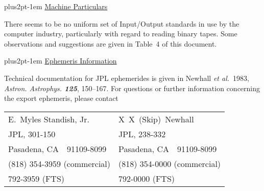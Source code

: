 \documentclass[twoside,11pt,nolof]{starlink}
\providecommand{\hdg}[1]{\vskip4pt plus2pt\leavevmode\kern-1em \underline{\large{#1}}\par}
\begin{document}
\hdg{Machine Particulars}

There seems to be no uniform set of Input/Output standards in use by
the computer industry, particularly with regard to reading
binary tapes. Some observations and suggestions are given in Table~4 of
this document.

\hdg{Ephemeris Information}

Technical documentation for JPL ephemerides is given in
Newhall \textit{et al.}~1983, \textit{Astron. Astrophys. \textbf{125}},
150--167.
For questions or further information concerning the export
ephemeris, please contact

\begin{center}
\begin{tabular}{ll}
E.~Myles Standish, Jr.         & X~X~(Skip)~Newhall \\
JPL, 301-150                   & JPL, 238-332 \\
Pasadena, CA\ \ 91109-8099     & Pasadena, CA\ \ 91109-8099 \\
(818) 354-3959 (commercial)    & (818) 354-0000 (commercial) \\
\phantom{(818)} 792-3959 (FTS) & \phantom{(818)} 792-0000 (FTS)
\end{tabular}
\end{center}


\newpage                                               %


\end{document}
